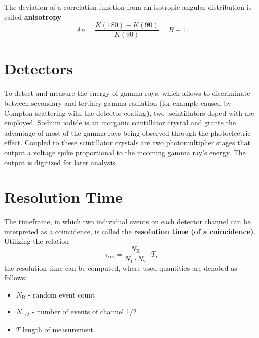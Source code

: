 The deviation of a correlation function from an isotropic angular distribution is called \textbf{anisotropy}
\begin{equation}\label{eq:aniso}
	An=\frac{K(180)-K(90)}{K(90)}=B-1.
\end{equation}

\section{Detectors}\label{sec:detectors}
To detect and measure the energy of gamma rays, which allows to discriminate between secondary and tertiary gamma radiation (for example caused by Compton scattering with the detector coating), two -scintillators doped with  are employed.
Sodium iodide is an inorganic scintillator crystal and grants the advantage of most of the gamma rays being observed through the photoelectric effect.
Coupled to these scintillator crystals are two photomultiplier stages that output a voltage spike proportional to the incoming gamma ray's energy. 
The output is digitized for later analysis.

\section{Resolution Time}
The timeframe, in which two individual events on each detector channel can be interpreted as a coincidence, is called the \textbf{resolution time (of a coincidence)}.
Utilizing the relation
\begin{equation}\label{eq:res_time}
	\tau_\text{res}=\frac{N_\text{R}}{N_1\cdot N_2}\cdot T,
\end{equation}
the resolution time can be computed, where used quantities are denoted as follows:
\begin{itemize}
	\item $N_\text{R}$ - random event count
	\item $N_{1/2}$ - number of events of channel 1/2
	\item $T$ length of measurement.
\end{itemize}
